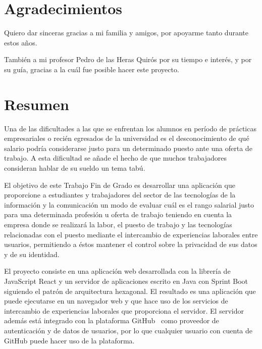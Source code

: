 \documentclass[a4paper, 12pt]{book}
\begin{document}

    \chapter*{Agradecimientos}

    Quiero dar sinceras gracias a mi familia y amigos, por apoyarme tanto durante estos años.

    También a mi profesor Pedro de las Heras Quirós por su tiempo e interés, y por su guía, gracias a la cuál
    fue posible hacer este proyecto.


    \chapter*{Resumen}

    Una de las dificultades a las que se enfrentan los alumnos en período de prácticas empresariales o recién egresados de la universidad
    es el desconocimiento de qué salario podría considerarse justo para un determinado puesto ante una oferta de trabajo.
    A esta dificultad se añade el hecho de que muchos trabajadores consideran hablar de su sueldo un tema tabú.

    El objetivo de este Trabajo Fin de Grado es desarrollar una aplicación que proporcione a estudiantes y trabajadores
    del sector de las tecnologías de la información y la comunicación un modo de evaluar cuál es el rango salarial justo
    para una determinada profesión u oferta de trabajo teniendo en cuenta la empresa donde se realizará la labor,
    el puesto de trabajo y las tecnologías relacionadas con el puesto mediante el intercambio de experiencias laborales
    entre usuarios, permitiendo a éstos mantener el control sobre la privacidad de sus datos y de su identidad.

    El proyecto consiste en una aplicación web desarrollada con la librería de JavaScript React y un servidor de aplicaciones escrito en Java
    con Sprint Boot siguiendo el patrón de arquitectura hexagonal. El resultado es una aplicación que puede ejecutarse en un navegador web
    y que hace uso de los servicios de intercambio de experiencias laborales que proporciona el servidor.
    El servidor además está integrado con la plataforma GitHub~\cite{bib:github} como proveedor de autenticación y de datos de usuarios, por lo que cualquier
    usuario con cuenta de GitHub puede hacer uso de la plataforma.
\end{document}
